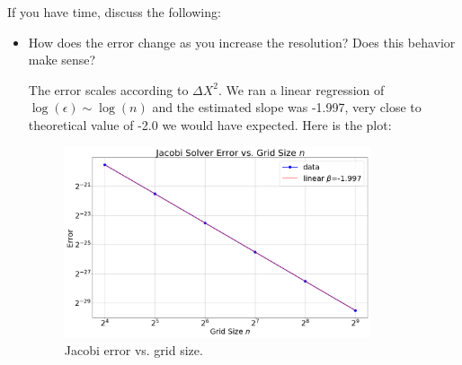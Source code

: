 \documentclass[11pt]{article}
\begin{document}
    If you have time, discuss the following:
    \begin{itemize}
      \item How does the error change as you increase the resolution? Does this behavior make sense?
      \begin{solution}
        The error scales according to $\Delta X^2$.  
        We ran a linear regression of $\log(\epsilon) \sim \log(n)$
        and the estimated slope was -1.997, very close to theoretical value of -2.0 we would have expected.
        Here is the plot:
        \begin{figure}[H]
            \centering
            \includegraphics[width=0.85\textwidth]{jacobi_error.png}
            \caption{Jacobi error vs. grid size.}
        \end{figure}
      \end{solution}



\end{itemize}
\end{document}
